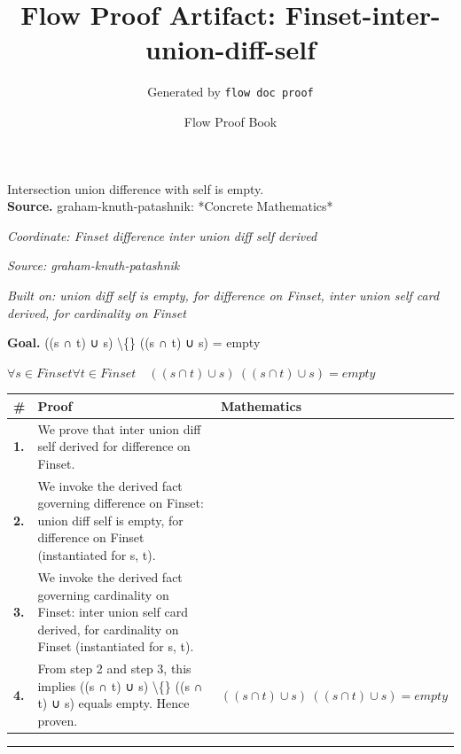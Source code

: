 \documentclass[11pt]{article}
\title{Flow Proof Artifact: Finset-inter-union-diff-self}
\author{Generated by \texttt{flow doc proof}}
\date{Flow Proof Book}
\theoremstyle{definition}
\begin{document}
\maketitle
Intersection union difference with self is empty.\\[0.5em]
\textbf{Source.} graham-knuth-patashnik: *Concrete Mathematics*\\[0.5em]
\bigskip
{}\par
\smallskip\noindent\textit{Coordinate: Finset \cdot difference \cdot inter union diff self derived}\par
\smallskip\noindent\textit{Source: graham-knuth-patashnik}\par
\smallskip\noindent\textit{Built on: union diff self is empty, for difference on Finset, inter union self card derived, for cardinality on Finset}\par
\medskip
\noindent\textbf{Goal.} ((s ∩ t) ∪ s) \textbackslash\{\} ((s ∩ t) ∪ s) = empty\par
\noindent$\displaystyle \forall s \in Finset \forall t \in Finset\quad ((s ∩ t) ∪ s) \ ((s ∩ t) ∪ s) = empty$\par
\medskip
\noindent
\begin{tabular}{@{} >{\raggedright\arraybackslash}p{} >{\raggedright\arraybackslash}p{} >{\raggedleft\arraybackslash}p{} @{}}
\textbf{\#} & \textbf{Proof} & \textbf{Mathematics} \\
\midrule
\textbf{1.} & We prove that inter union diff self derived for difference on Finset. & \\[0.45em]
\textbf{2.} & We invoke the derived fact governing difference on Finset: union diff self is empty, for difference on Finset (instantiated for s, t). & \\[0.45em]
\textbf{3.} & We invoke the derived fact governing cardinality on Finset: inter union self card derived, for cardinality on Finset (instantiated for s, t). & \\[0.45em]
\textbf{4.} & From step 2 and step 3, this implies ((s ∩ t) ∪ s) \textbackslash\{\} ((s ∩ t) ∪ s) equals empty. Hence proven. & $\displaystyle ((s ∩ t) ∪ s) \ ((s ∩ t) ∪ s) = empty$ \\[0.45em]
\bottomrule
\end{tabular}
\label{thm:Finset-difference-inter_union_diff_self_derived}
\par\medskip\hrule
\end{document}
